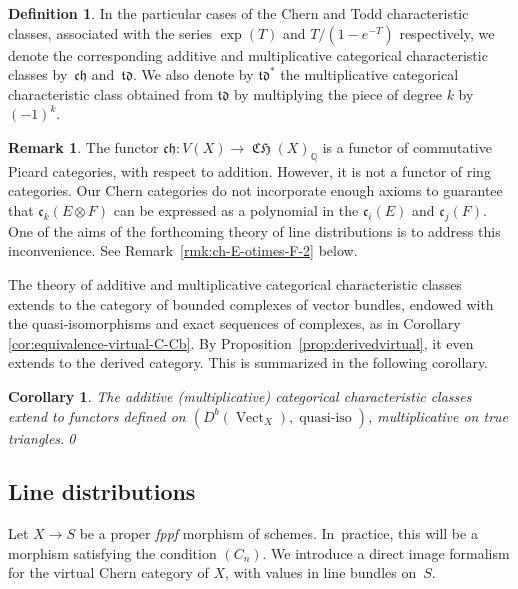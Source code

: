 \documentclass[JEP,XML,SOM,Unicode,published]{cedram}
\theoremstyle{plain}
\newtheorem{corollary}[theorem]{Corollary}
\theoremstyle{definition}
\newtheorem{definition}[theorem]{Definition}
\newtheorem{remark}[theorem]{Remark}
\newcommand{\QBbb}{\mathbb Q}
\newcommand{\cfrak}{\mathfrak c}
\newcommand{\chfrak}{\mathfrak {ch}}
\newcommand{\tdfrak}{\mathfrak {td}}
\newcommand{\fppf}{\emph{fppf}\xspace}
\DeclareMathOperator{\CHfrak}{\mathfrak{CH}}
\DeclareMathOperator{\qiso}{quasi-iso}
\DeclareMathOperator{\Vect}{Vect}
\begin{document}
\begin{definition}\label{def:ChernToddchar}
In the particular cases of the Chern and Todd characteristic classes, associated with the series $\exp(T)$ and $T/(1-e^{-T})$ respectively, we denote the corresponding additive and multiplicative categorical characteristic classes by~$\chfrak$ and~$\tdfrak$. We also denote by $\tdfrak^{*}$ the multiplicative categorical characteristic class obtained from $\tdfrak$ by multiplying the piece of degree $k$ by $(-1)^{k}$.
\end{definition}

\begin{remark}\label{rmk:ch-E-otimes-F}
The functor $\chfrak\colon V(X)\to\CHfrak(X)_{\QBbb}$ is a functor of commutative \hbox{Picard} categories, with respect to addition. However, it is not a functor of ring categories. Our Chern categories do not incorporate enough axioms to guarantee that $\cfrak_{k}(E\otimes F)$ can be expressed as a polynomial in the $\cfrak_{i}(E)$ and $\cfrak_{j}(F)$. One of the aims of the forthcoming theory of line distributions is to address this inconvenience. See Remark~\ref{rmk:ch-E-otimes-F-2} below.
\end{remark}

The theory of additive and multiplicative categorical characteristic classes extends to the category of bounded complexes of vector bundles, endowed with the quasi-isomorphisms and exact sequences of complexes, as in Corollary \ref{cor:equivalence-virtual-C-Cb}. By Proposition~\ref{prop:derivedvirtual}, it even extends to the derived category. This is summarized in the following corollary.

\begin{corollary}\label{cor:characteristic-derived}
The additive (\resp multiplicative) categorical characteristic classes extend to functors defined on $(D^b(\Vect_X), \qiso)$, multiplicative on true triangles.\qed
\end{corollary}

\subsection{Line distributions}\label{subsec:line-distributions}
Let $X\to S$ be a proper \fppf morphism of schemes. In~practice, this will be a morphism satisfying the condition $(C_{n})$. We introduce a direct image formalism for the virtual Chern category of $X$, with values in line bundles on~$S$.\enlargethispage{.5\baselineskip}%
\end{document}
